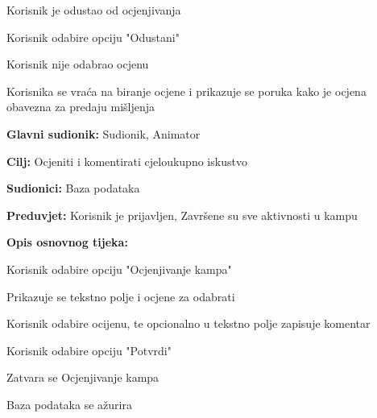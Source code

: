 \begin{packed_item}
\begin{packed_item}
\begin{packed_item}
\begin{packed_enum}
							\end{packed_enum}
							\item[4.a] Korisnik je odustao od ocjenjivanja
							\item[] \begin{packed_enum}
								
								\item Korisnik odabire opciju "Odustani"
								
							\end{packed_enum}
							\item[5.a] Korisnik nije odabrao ocjenu
							\item[] \begin{packed_enum}
								
								\item Korisnika se vraća na biranje ocjene i prikazuje se poruka kako je ocjena obavezna za predaju mišljenja
								
							\end{packed_enum}
							
						\end{packed_item}
					\end{packed_item}
				
					\noindent {}
					\begin{packed_item}
						
						\item \textbf{Glavni sudionik: } Sudionik, Animator
						\item  \textbf{Cilj:} Ocjeniti i komentirati cjeloukupno iskustvo
						\item  \textbf{Sudionici:} Baza podataka
						\item  \textbf{Preduvjet:} Korisnik je prijavljen, Završene su sve aktivnosti u kampu
						\item  \textbf{Opis osnovnog tijeka:}
						
						\item[] \begin{packed_enum}
							
							\item Korisnik odabire opciju "Ocjenjivanje kampa"
							\item Prikazuje se tekstno polje i ocjene za odabrati
							\item Korisnik odabire ocijenu, te opcionalno u tekstno polje zapisuje komentar
							\item Korisnik odabire opciju "Potvrdi"
							\item Zatvara se Ocjenjivanje kampa
							\item Baza podataka se ažurira
						\end{packed_enum}
						

\end{packed_item}
\end{packed_item}
